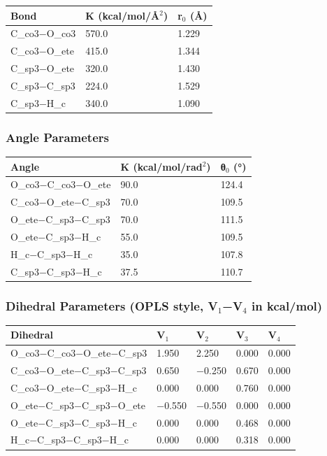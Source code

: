 \documentclass[
  11pt,
]{article}
\newcounter{none} %
\begin{document}
{\def\LTcaptype{none} %
\begin{longtable}[]{@{}lll@{}}
\toprule\noalign{}
Bond & K (kcal/mol/\AA{}\(^{2}\)) & r\(_{0}\) (\AA{}) \\
\midrule\noalign{}
\endhead
\bottomrule\noalign{}
\endlastfoot
C\_co3−O\_co3 & 570.0 & 1.229 \\
C\_co3−O\_ete & 415.0 & 1.344 \\
C\_sp3−O\_ete & 320.0 & 1.430 \\
C\_sp3−C\_sp3 & 224.0 & 1.529 \\
C\_sp3−H\_c & 340.0 & 1.090 \\
\end{longtable}
}

\subsubsection{Angle Parameters}\label{angle-parameters}

{\def\LTcaptype{none} %
\begin{longtable}[]{@{}lll@{}}
\toprule\noalign{}
Angle & K (kcal/mol/rad\(^{2}\)) & θ\(_{0}\) (°) \\
\midrule\noalign{}
\endhead
\bottomrule\noalign{}
\endlastfoot
O\_co3−C\_co3−O\_ete & 90.0 & 124.4 \\
C\_co3−O\_ete−C\_sp3 & 70.0 & 109.5 \\
O\_ete−C\_sp3−C\_sp3 & 70.0 & 111.5 \\
O\_ete−C\_sp3−H\_c & 55.0 & 109.5 \\
H\_c−C\_sp3−H\_c & 35.0 & 107.8 \\
C\_sp3−C\_sp3−H\_c & 37.5 & 110.7 \\
\end{longtable}
}

\subsubsection{\texorpdfstring{Dihedral Parameters (OPLS style,
V\(_{1}\)−V\(_{4}\) in
kcal/mol)}{Dihedral Parameters (OPLS style, V\_\{1\}−V\_\{4\} in kcal/mol)}}\label{dihedral-parameters-opls-style-v_1v_4-in-kcalmol}

{\def\LTcaptype{none} %
\begin{longtable}[]{@{}lllll@{}}
\toprule\noalign{}
Dihedral & V\(_{1}\) & V\(_{2}\) & V\(_{3}\) & V\(_{4}\) \\
\midrule\noalign{}
\endhead
\bottomrule\noalign{}
\endlastfoot
O\_co3−C\_co3−O\_ete−C\_sp3 & 1.950 & 2.250 & 0.000 & 0.000 \\
C\_co3−O\_ete−C\_sp3−C\_sp3 & 0.650 & −0.250 & 0.670 & 0.000 \\
C\_co3−O\_ete−C\_sp3−H\_c & 0.000 & 0.000 & 0.760 & 0.000 \\
O\_ete−C\_sp3−C\_sp3−O\_ete & −0.550 & −0.550 & 0.000 & 0.000 \\
O\_ete−C\_sp3−C\_sp3−H\_c & 0.000 & 0.000 & 0.468 & 0.000 \\
H\_c−C\_sp3−C\_sp3−H\_c & 0.000 & 0.000 & 0.318 & 0.000 \\
\end{longtable}
}
\end{document}
